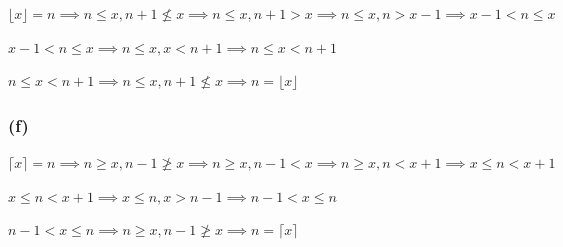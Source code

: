 \documentclass{article}
\begin{document}
\( \lfloor x \rfloor = n \implies n \leq x, n + 1 \nleq x \implies n \leq x, n + 1 > x \implies n \leq x, n > x - 1 \implies x - 1 < n \leq x \)

\( x-1 < n \leq x \implies n \leq x, x < n + 1 \implies n \leq x < n + 1 \)

\( n \leq x < n + 1 \implies n \leq x, n+1 \nleq x \implies n = \lfloor x \rfloor \)

\subsubsection*{(f)}

\( \lceil x \rceil = n \implies n \geq x, n - 1 \ngeq x \implies n \geq x, n - 1 < x \implies n \geq x, n < x + 1 \implies x \leq n < x + 1 \)

\( x \leq n < x + 1 \implies x \leq n, x > n - 1 \implies n - 1 < x \leq n \)

\( n - 1 < x \leq n \implies n \geq x, n-1 \ngeq x \implies n = \lceil x \rceil \)
\end{document}
